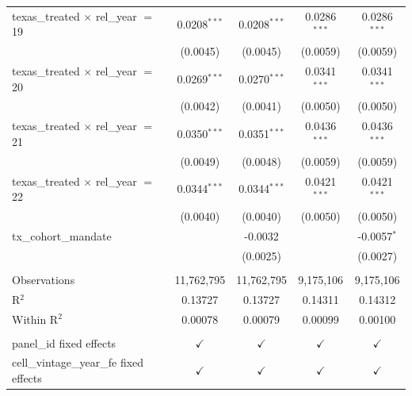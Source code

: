 \begin{tabular}{lcccc}
   texas\_treated $\times$ rel\_year $=$ 19     & 0.0208$^{***}$ & 0.0208$^{***}$        & 0.0286$^{***}$  & 0.0286$^{***}$\\   
                                                & (0.0045)       & (0.0045)              & (0.0059)        & (0.0059)\\   
   texas\_treated $\times$ rel\_year $=$ 20     & 0.0269$^{***}$ & 0.0270$^{***}$        & 0.0341$^{***}$  & 0.0341$^{***}$\\   
                                                & (0.0042)       & (0.0041)              & (0.0050)        & (0.0050)\\   
   texas\_treated $\times$ rel\_year $=$ 21     & 0.0350$^{***}$ & 0.0351$^{***}$        & 0.0436$^{***}$  & 0.0436$^{***}$\\   
                                                & (0.0049)       & (0.0048)              & (0.0059)        & (0.0059)\\   
   texas\_treated $\times$ rel\_year $=$ 22     & 0.0344$^{***}$ & 0.0344$^{***}$        & 0.0421$^{***}$  & 0.0421$^{***}$\\   
                                                & (0.0040)       & (0.0040)              & (0.0050)        & (0.0050)\\   
   tx\_cohort\_mandate                          &                & -0.0032               &                 & -0.0057$^{*}$\\   
                                                &                & (0.0025)              &                 & (0.0027)\\   
    \\
   Observations                                 & 11,762,795     & 11,762,795            & 9,175,106       & 9,175,106\\  
   R$^2$                                        & 0.13727        & 0.13727               & 0.14311         & 0.14312\\  
   Within R$^2$                                 & 0.00078        & 0.00079               & 0.00099         & 0.00100\\  
    \\
   panel\_id fixed effects                      & $\checkmark$   & $\checkmark$          & $\checkmark$    & $\checkmark$\\   
   cell\_vintage\_year\_fe fixed effects        & $\checkmark$   & $\checkmark$          & $\checkmark$    & $\checkmark$\\   
   \bottomrule
\end{tabular}
\par\endgroup


